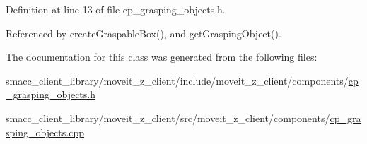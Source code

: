 Definition at line 13 of file cp\+\_\+grasping\+\_\+objects.\+h.



Referenced by create\+Graspable\+Box(), and get\+Grasping\+Object().



The documentation for this class was generated from the following files\+:\begin{DoxyCompactItemize}
\item 
smacc\+\_\+client\+\_\+library/moveit\+\_\+z\+\_\+client/include/moveit\+\_\+z\+\_\+client/components/\hyperlink{cp__grasping__objects_8h}{cp\+\_\+grasping\+\_\+objects.\+h}\item 
smacc\+\_\+client\+\_\+library/moveit\+\_\+z\+\_\+client/src/moveit\+\_\+z\+\_\+client/components/\hyperlink{cp__grasping__objects_8cpp}{cp\+\_\+grasping\+\_\+objects.\+cpp}\end{DoxyCompactItemize}
